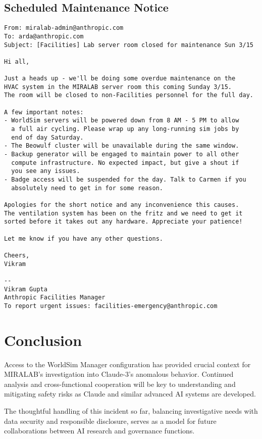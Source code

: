 \documentclass{article}
\begin{document}
\subsection{Scheduled Maintenance Notice}
\label{apx:maintenancenotice}
\begin{verbatim}
From: miralab-admin@anthropic.com
To: arda@anthropic.com
Subject: [Facilities] Lab server room closed for maintenance Sun 3/15

Hi all,

Just a heads up - we'll be doing some overdue maintenance on the 
HVAC system in the MIRALAB server room this coming Sunday 3/15. 
The room will be closed to non-Facilities personnel for the full day.

A few important notes:
- WorldSim servers will be powered down from 8 AM - 5 PM to allow
  a full air cycling. Please wrap up any long-running sim jobs by  
  end of day Saturday.
- The Beowulf cluster will be unavailable during the same window.
- Backup generator will be engaged to maintain power to all other 
  compute infrastructure. No expected impact, but give a shout if 
  you see any issues.
- Badge access will be suspended for the day. Talk to Carmen if you
  absolutely need to get in for some reason.

Apologies for the short notice and any inconvenience this causes. 
The ventilation system has been on the fritz and we need to get it sorted before it takes out any hardware. Appreciate your patience!

Let me know if you have any other questions.

Cheers,
Vikram

-- 
Vikram Gupta
Anthropic Facilities Manager
To report urgent issues: facilities-emergency@anthropic.com

\end{verbatim}

\section{Conclusion}
Access to the WorldSim Manager configuration has provided crucial context for MIRALAB's investigation into Claude-3's anomalous behavior. Continued analysis and cross-functional cooperation will be key to understanding and mitigating safety risks as Claude and similar advanced AI systems are developed.

The thoughtful handling of this incident so far, balancing investigative needs with data security and responsible disclosure, serves as a model for future collaborations between AI research and governance functions. 
\end{document}
